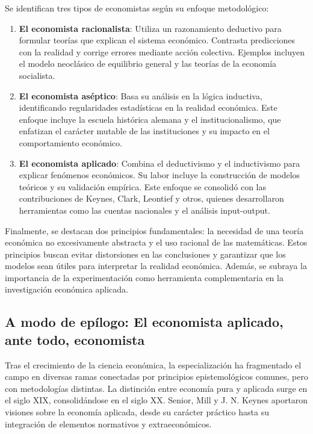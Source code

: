 \documentclass[12pt]{book} %
\begin{document}
Se identifican tres tipos de economistas según su enfoque metodológico:

\begin{enumerate}
\def\labelenumi{\arabic{enumi}.}
\item
  \textbf{El economista racionalista}: Utiliza un razonamiento deductivo
  para formular teorías que explican el sistema económico. Contrasta
  predicciones con la realidad y corrige errores mediante acción
  colectiva. Ejemplos incluyen el modelo neoclásico de equilibrio
  general y las teorías de la economía socialista.
\item
  \textbf{El economista aséptico}: Basa su análisis en la lógica
  inductiva, identificando regularidades estadísticas en la realidad
  económica. Este enfoque incluye la escuela histórica alemana y el
  institucionalismo, que enfatizan el carácter mutable de las
  instituciones y su impacto en el comportamiento económico.
\item
  \textbf{El economista aplicado}: Combina el deductivismo y el
  inductivismo para explicar fenómenos económicos. Su labor incluye la
  construcción de modelos teóricos y su validación empírica. Este
  enfoque se consolidó con las contribuciones de Keynes, Clark, Leontief
  y otros, quienes desarrollaron herramientas como las cuentas
  nacionales y el análisis input-output.
\end{enumerate}

Finalmente, se destacan dos principios fundamentales: la necesidad de
una teoría económica no excesivamente abstracta y el uso racional de las
matemáticas. Estos principios buscan evitar distorsiones en las
conclusiones y garantizar que los modelos sean útiles para interpretar
la realidad económica. Además, se subraya la importancia de la
experimentación como herramienta complementaria en la investigación
económica aplicada.

\hypertarget{a-modo-de-epuxedlogo-el-economista-aplicado-ante-todo-economista}{%
\subsection{A modo de epílogo: El economista aplicado, ante todo,
economista}\label{a-modo-de-epuxedlogo-el-economista-aplicado-ante-todo-economista}}

Tras el crecimiento de la ciencia económica, la especialización ha
fragmentado el campo en diversas ramas conectadas por principios
epistemológicos comunes, pero con metodologías distintas. La distinción
entre economía pura y aplicada surge en el siglo XIX, consolidándose en
el siglo XX. Senior, Mill y J. N. Keynes aportaron visiones sobre la
economía aplicada, desde su carácter práctico hasta su integración de
elementos normativos y extraeconómicos.
\end{document}
